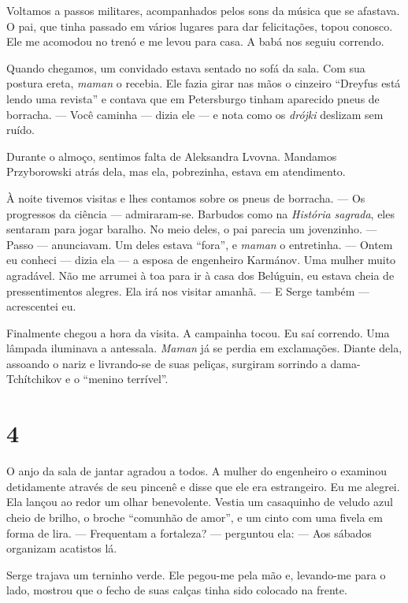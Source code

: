 Voltamos a passos militares, acompanhados pelos sons da música que se
afastava. O pai, que tinha passado em vários lugares para dar
felicitações, topou conosco. Ele me acomodou no trenó e me levou para
casa. A babá nos seguiu correndo.

Quando chegamos, um convidado estava sentado no sofá da sala. Com sua
postura ereta, \emph{maman} o recebia. Ele fazia girar nas mãos o
cinzeiro ``Dreyfus está lendo uma revista'' e contava que em Petersburgo
tinham aparecido pneus de borracha. --- Você caminha --- dizia ele --- e
nota como os \emph{drójki} deslizam sem ruído.

Durante o almoço, sentimos falta de Aleksandra Lvovna. Mandamos
Przyborowski atrás dela, mas ela, pobrezinha, estava em atendimento.

À noite tivemos visitas e lhes contamos sobre os pneus de borracha. ---
Os progressos da ciência --- admiraram-se. Barbudos como na
\emph{História sagrada}, eles sentaram para jogar baralho. No meio
deles, o pai parecia um jovenzinho. --- Passo --- anunciavam. Um deles
estava ``fora'', e \emph{maman} o entretinha. --- Ontem eu conheci ---
dizia ela --- a esposa de engenheiro Karmánov. Uma mulher muito
agradável. Não me arrumei à toa para ir à casa dos Belúguin, eu estava
cheia de pressentimentos alegres. Ela irá nos visitar amanhã. --- E
Serge também --- acrescentei eu.

Finalmente chegou a hora da visita. A campainha tocou. Eu saí correndo.
Uma lâmpada iluminava a antessala. \emph{Maman} já se perdia em
exclamações. Diante dela, assoando o nariz e livrando-se de suas
peliças, surgiram sorrindo a dama-Tchítchikov e o ``menino terrível''.

\section{4}

O anjo da sala de jantar agradou a todos. A mulher do engenheiro o
examinou detidamente através de seu pincenê e disse que ele era
estrangeiro. Eu me alegrei. Ela lançou ao redor um olhar benevolente.
Vestia um casaquinho de veludo azul cheio de brilho, o broche ``comunhão
de amor'', e um cinto com uma fivela em forma de lira. --- Frequentam a
fortaleza? --- perguntou ela: --- Aos sábados organizam acatistos lá.

Serge trajava um terninho verde. Ele pegou-me pela mão e, levando-me
para o lado, mostrou que o fecho de suas calças tinha sido colocado na
frente.

